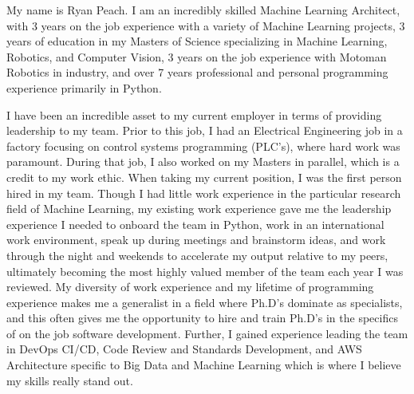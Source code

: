 My name is Ryan Peach. I am an incredibly skilled Machine Learning Architect, with 3 years on the job experience with a variety of Machine Learning projects, 3 years of education in my Masters of Science specializing in Machine Learning, Robotics, and Computer Vision, 3 years on the job experience with Motoman Robotics in industry, and over 7 years professional and personal programming experience primarily in Python.

I have been an incredible asset to my current employer in terms of providing leadership to my team. Prior to this job, I had an Electrical Engineering job in a factory focusing on control systems programming (PLC's), where hard work was paramount. During that job, I also worked on my Masters in parallel, which is a credit to my work ethic. When taking my current position, I was the first person hired in my team. Though I had little work experience in the particular research field of Machine Learning, my existing work experience gave me the leadership experience I needed to onboard the team in Python, work in an international work environment, speak up during meetings and brainstorm ideas, and work through the night and weekends to accelerate my output relative to my peers, ultimately becoming the most highly valued member of the team each year I was reviewed. My diversity of work experience and my lifetime of programming experience makes me a generalist in a field where Ph.D's dominate as specialists, and this often gives me the opportunity to hire and train Ph.D's in the specifics of on the job software development. Further, I gained experience leading the team in DevOps CI/CD, Code Review and Standards Development, and AWS Architecture specific to Big Data and Machine Learning which is where I believe my skills really stand out.
    
